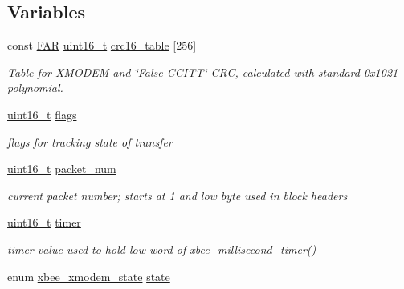 \subsection*{Variables}
\begin{DoxyCompactItemize}
\item 
const \hyperlink{group__hal_gaef060b3456fdcc093a7210a762d5f2ed}{F\-A\-R} \hyperlink{group__hal_ga5a8b2dc9e45a9ee81a94ef304fb62505}{uint16\-\_\-t} \hyperlink{group__util__xmodem_gab903230030042c3ee444aa887b705e06}{crc16\-\_\-table} \mbox{[}256\mbox{]}
\begin{DoxyCompactList}\small\item\em Table for X\-M\-O\-D\-E\-M and \char`\"{}\-False C\-C\-I\-T\-T\char`\"{} C\-R\-C, calculated with standard 0x1021 polynomial. \end{DoxyCompactList}\item 
\hypertarget{group__util__xmodem_ga1e87af3c18a2fd36c61faf89949bdc3f}{\hyperlink{group__hal_ga5a8b2dc9e45a9ee81a94ef304fb62505}{uint16\-\_\-t} \hyperlink{group__util__xmodem_ga1e87af3c18a2fd36c61faf89949bdc3f}{flags}}\label{group__util__xmodem_ga1e87af3c18a2fd36c61faf89949bdc3f}

\begin{DoxyCompactList}\small\item\em flags for tracking state of transfer \end{DoxyCompactList}\item 
\hypertarget{group__util__xmodem_ga59de4bab5575291b6b4ace70d7e50af5}{\hyperlink{group__hal_ga5a8b2dc9e45a9ee81a94ef304fb62505}{uint16\-\_\-t} \hyperlink{group__util__xmodem_ga59de4bab5575291b6b4ace70d7e50af5}{packet\-\_\-num}}\label{group__util__xmodem_ga59de4bab5575291b6b4ace70d7e50af5}

\begin{DoxyCompactList}\small\item\em current packet number; starts at 1 and low byte used in block headers \end{DoxyCompactList}\item 
\hypertarget{group__util__xmodem_gaea00c2c1dec6e8f58532f25c65210d9e}{\hyperlink{group__hal_ga5a8b2dc9e45a9ee81a94ef304fb62505}{uint16\-\_\-t} \hyperlink{group__util__xmodem_gaea00c2c1dec6e8f58532f25c65210d9e}{timer}}\label{group__util__xmodem_gaea00c2c1dec6e8f58532f25c65210d9e}

\begin{DoxyCompactList}\small\item\em timer value used to hold low word of xbee\-\_\-millisecond\-\_\-timer() \end{DoxyCompactList}\item 
\hypertarget{group__util__xmodem_ga73b81fc5d708360fbba38aee9bc2eac0}{enum \hyperlink{group__util__xmodem_gaca3fc49d80cd9afccc34812b2985484f}{xbee\-\_\-xmodem\-\_\-state} \hyperlink{group__util__xmodem_ga73b81fc5d708360fbba38aee9bc2eac0}{state}}\label{group__util__xmodem_ga73b81fc5d708360fbba38aee9bc2eac0}


\end{DoxyCompactItemize}
